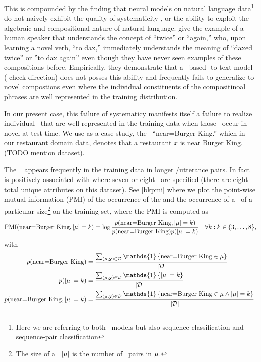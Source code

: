 This is compounded by the finding that neural models on natural language data\footnote{Here we are referring to both \sequencetosequence~models but also 
sequence classification and sequence-pair classification }  do not 
naively exhibit the quality of systematicity \citep{fodor,genwosys}, or 
the ability to exploit the algebraic and compositional 
nature of natural language. \citet{genwosys} give the example of a human
speaker that understands the concept of ``twice'' or ``again,'' who, upon
learning a novel verb, ``to dax,'' immediately understands the meaning 
of ``daxed twice'' or ''to dax again'' even though they have never seen 
examples of these compositions before. Empirically, they demonstrate that a
\recurrentneuralnetwork~based \meaningrepresentation-to-text model ({\color{red} check direction}) does not posses this ability and frequently fails to 
generalize to novel compostions even where the individual constituents of 
the compositinoal phrases are well represented in the training distribution.

In our present case, this failure of systematicy manifests itself a failure
to realize individual \attributevalues~that are well represented in the 
training data when those \attributevalues~occur in novel \meaningrepresentations at test time. We use as a case-study, the \attributevalue~``near=Burger King.'' which in our restaurant domain data, denotes that a restaurant $x$ is near
Burger King. (TODO mention dataset).

The \attributevalue~ appears frequently in the training
data in longer \meaningrepresentation/utterance pairs. In fact  is positively associated with \meaningrepresentations where seven or eight \attributes~are specified (there are eight total unique attributes on this
dataset). See \autoref{bkpmi} where we plot the point-wise mutual information
(PMI) \citep{chruch1990} of the occurrence of the  and the occurrence of a \meaningrepresentation~of a particular size\footnote{The size of a \meaningrepresentation~${\left\vert \mu \right\vert}$ is the number of \attributevalue~pairs in $\mu$.} on the training set, where the PMI is computed as 
\[\operatorname*{PMI}(\textrm{near=Burger King},  {\left\vert \mu \right\vert} = k) = \log \frac{p(\textrm{near=Burger King}, {\left\vert \mu \right\vert} = k)}{p( \textrm{near=Burger King}  ) p({\left\vert \mu \right\vert} = k)}     \quad \forall k : k \in \{3,\ldots,8\},\]
with \begin{align*}
    p(\AV{near}{Burger King}) &= \frac{\sum_{(\mr,\utttoks) \in \corpus}\mathds{1}\left\{ \AV{near}{Burger King} \in \mr \right\}}{\setsize{\corpus}} \\
    p(\setsize{\mr}=k) &= \frac{\sum_{(\mr,\utttoks) \in \corpus}\mathds{1}\left\{ \setsize{\mr} = k \right\}}{\setsize{\corpus}} \\
    p(\AV{near}{Burger King},\setsize{\mr}=k) &= \frac{\sum_{(\mr,\utttoks) \in \corpus}\mathds{1}\left\{\AV{near}{Burger King} \in \mr \wedge \setsize{\mr} = k \right\}}{\setsize{\corpus}}.
\end{align*}


